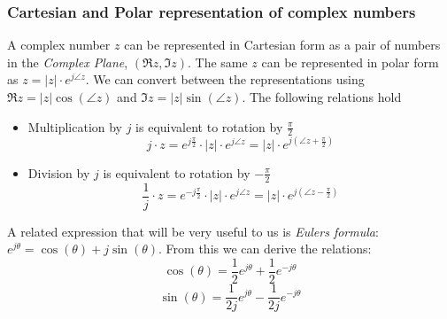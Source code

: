 \subsubsection*{Cartesian and Polar representation of complex numbers}

A complex number $z$ can be represented in Cartesian form as a pair of numbers in the \textit{Complex Plane}, $(\Re{z},\Im{z})$. The same $z$ can be represented in polar form as $z = |z|\cdot e^{j\angle z}$. We can convert between the representations using  $\Re{z} = |z| \cos(\angle z)$ and $\Im{z} = |z| \sin(\angle z)$. The following relations hold

\begin{itemize}
\item Multiplication by $j$ is equivalent to rotation by $\tfrac{\pi}{2}$
\[
j\cdot z = e^{j\tfrac{\pi}{2}}\cdot |z|\cdot e^{j\angle z} = |z|\cdot e^{j(\angle z + \tfrac{\pi}{2})} 
\]
\item Division by $j$ is equivalent to rotation by $- \tfrac{\pi}{2}$
\[
\frac{1}{j}\cdot z = e^{-j\tfrac{\pi}{2}}\cdot |z|\cdot e^{j\angle z} = |z|\cdot e^{j(\angle z - \tfrac{\pi}{2})} 
\]
\end{itemize}

A related expression that will be very useful to us is \textit{Eulers formula}: $e^{j\theta} = \cos(\theta) + j\sin(\theta)$. From this we can derive the relations:
\[
\cos(\theta) = \frac{1}{2} e^{j\theta} + \frac{1}{2} e^{-j\theta} 
\]
\[
\sin(\theta) = \frac{1}{2j} e^{j\theta} - \frac{1}{2j} e^{-j\theta} 
\]


